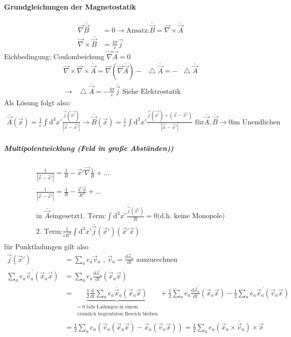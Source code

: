 \documentclass[a4paper]{article}
\newcommand*\laplace{\mathop{}\!\mathbin\bigtriangleup}
\begin{document}
\paragraph{Grundgleichungen der Magnetostatik}
\begin{align}
\vec{\nabla}\bar{\vec{B}}&=0 \rightarrow \text{Ansatz:
}\bar{\vec{B}}=\vec{\nabla}\times \bar{\vec{A}}\\
\vec{\nabla}\times\bar{\vec{B}}&=\frac{4\pi}{c}\vec{j}
\end{align}
Eichbedingung: Coulombeichung $\vec{\nabla}\vec{A}=0$
\begin{align}
\vec{\nabla}\times\vec{\nabla}\times\bar{\vec{A}}=\vec{\nabla}(
\vec{\nabla}\bar{\vec{A}})-\laplace \bar{\vec{A}}=-\laplace \bar{\vec{A}}\\
\rightarrow \laplace \bar{\vec{A}}=-\frac{4\pi}{c}\bar{\vec{j}} \text{ Siehe
Elektrostatik}
\end{align}
Als Lösung folgt also:
\begin{align}
\bar{\vec{A}}(\vec{x})=\frac{1}{c}\int \mathrm{d}^3x' \frac{\bar{\vec{j}}(\vec{x'})}
{|\vec{x}-\vec{x}'|}
\rightarrow \bar{\vec{B}}(\vec{x})=\frac{1}{c}\int \mathrm{d}^3x'
\frac{\bar{\vec{j}}(\vec{x'})\times\left( \vec{x}-\vec{x}' \right)}
{|\vec{x}-\vec{x}'|} \text{  für} \bar{\vec{A}},\bar{\vec{B}}\rightarrow 0\text{
im Unendlichen}
\end{align}
\subparagraph{Multipolentwicklung (Feld in große Abständen))}
\begin{align}
\frac{1}{|\vec{x}-\vec{x}'|}=\frac{1}{R}-\vec{x}'\vec{\nabla}\frac{1}{R}+\ldots\\
\frac{1}{|\vec{x}-\vec{x}'|}=\frac{1}{R}-\frac{\vec{x}'\vec{x}}{R^3}+\ldots\\
\text{in }\bar{\vec{A}} \text{eingesetzt}
\text{1. Term:} \int \mathrm{d}^3 x' \frac{\bar{\vec{j}}(\vec{x}')}{R}=0
\text{(d.h. keine Monopole)}\\
\text{2. Term:} \frac{1}{cR^3}\int \mathrm{d}^3 x'\bar{\vec{j}}(\vec{x}')(\vec{x}'\vec{x})\\
\end{align}
für Punktladungen gilt also
\begin{align}
\vec{j}(\vec{x}')&=\sum_a e_a \vec{v}_a \text{ , }
\vec{v}_a=\frac{\mathrm{d}\vec{x}_a}{\mathrm{d}t} %
\text{ auszurechnen}\\
\overline{\sum_a e_a \vec{v}_a(\vec{x}_a\vec{x})} &=\overline{\sum_a e_a
\frac{\mathrm{d}\vec{x}_a}{\mathrm{d}t}(\vec{x}_a\vec{x})}\\
 &=\underbrace{\overline{\frac{1}{2}\frac{\mathrm{d}}{\mathrm{d}t}\sum_a e_a
\vec{x}_a(\vec{x}_a\vec{x})}}_{\substack{=0 \text{ falls Ladungen in einem}\\ \text{ räumlich
begrentzten Bereich bleiben}}} +\frac{1}{2}\overline{\sum_a e_a
\frac{\mathrm{d}\vec{x}_a}{\mathrm{d}t}(\vec{x}_a\vec{x})}-\frac{1}{2}\overline{\sum_a e_a \vec{x}_a
(\vec{v}_a\vec{x})}\\
 &=\frac{1}{2}\overline{\sum_a e_a \left( \vec{v}_a
(\vec{x}_a\vec{x})-\vec{x}_a
(\vec{v}_a\vec{x}) \right)}=\frac{1}{2}\sum_a e_a \overline{\left(
\vec{x}_a\times\vec{v}_a \right)\times\vec{x}}
\end{align}
\end{document}
